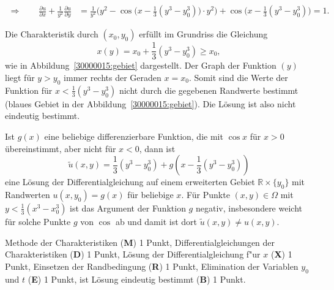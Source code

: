\begin{loesung}
\begin{teilaufgaben}
\begin{align*}
\Rightarrow
\qquad
\frac{\partial u}{\partial x}
+
\frac1{y^2}
\frac{\partial u}{\partial y}
&=
\frac1{y^2}\biggl(y^2 -
\cos\bigl(x-{\textstyle\frac13}(y^3-y_0^3)\bigr)
\cdot y^2\biggr)
+
\cos\bigl(x-{\textstyle\frac13}(y^3-y_0^3)\bigr)
=1.
\end{align*}
\item
Die Charakteristik durch $(x_0,y_0)$ erfüllt im Grundriss die Gleichung
\[
x(y)
=
x_0 + {\textstyle\frac13}(y^3-y_0^3)
\ge
x_0,
\]
wie in Abbildung~\ref{30000015:gebiet} dargestellt.
Der Graph der Funktion $(y)$ liegt für $y>y_0$ immer rechts der
Geraden $x=x_0$.
Somit sind die Werte der Funktion für $x < {\textstyle\frac13}(y^3-y_0^3)$
nicht durch die gegebenen Randwerte bestimmt (blaues Gebiet in der
Abbildung~\ref{30000015:gebiet}).
Die Lösung ist also nicht eindeutig bestimmt.
\qedhere
\end{teilaufgaben}
\end{loesung}

\begin{diskussion}
Ist $g(x)$ eine beliebige differenzierbare Funktion, die mit $\cos x$ 
für $x>0$ übereinstimmt, aber nicht für $x<0$, dann ist
\[
\tilde u(x,y) = {\textstyle\frac13}(y^3-y_0^3) + g(x-{\textstyle\frac13}(y^3-y_0^3))
\]
eine Lösung der Differentialgleichung auf einem erweiterten Gebiet
$\mathbb R \times \{y_0\}$ mit Randwerten $u(x, y_0)=g(x)$ für beliebige $x$.
Für Punkte $(x,y)\in\Omega$ mit $y<{\textstyle\frac13}(x^3-x_0^3)$
ist das Argument
der Funktion $g$ negativ, insbesondere weicht für solche Punkte $g$ von
$\cos$ ab und damit ist dort $\tilde u(x,y)\ne u(x,y)$.
\end{diskussion}

\begin{bewertung}
Methode der Charakteristiken ({\bf M}) 1 Punkt,
Differentialgleichungen der Charakteristiken ({\bf D}) 1 Punkt,
Lösung der Differentialgleichung f"ur $x$ ({\bf X}) 1 Punkt,
Einsetzen der Randbedingung ({\bf R}) 1 Punkt,
Elimination der Variablen $y_0$ und $t$ ({\bf E}) 1 Punkt,
ist Lösung eindeutig bestimmt ({\bf B}) 1 Punkt.
\end{bewertung}



